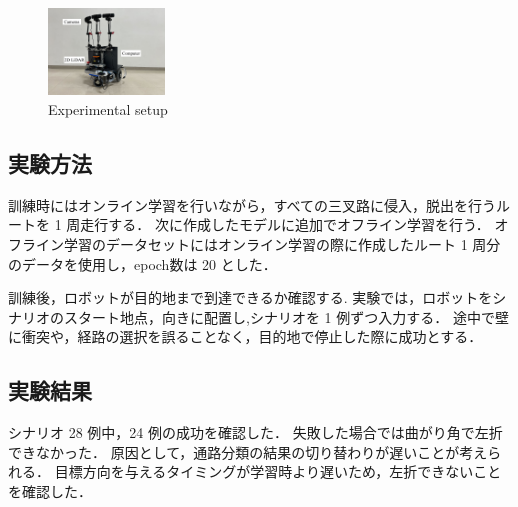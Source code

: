 \documentclass[10pt]{jarticle}
\begin{document}
    \begin{figure}[h]
        \centering
        \includegraphics[width=0.275\textwidth]{./fig/ishiguro/gamma.pdf}
        \caption{Experimental setup}
        \label{fig:gamma}
    \end{figure}
    
    \subsection{実験方法}

    訓練時にはオンライン学習を行いながら，すべての三叉路に侵入，脱出を行うルートを 1 周走行する．
    次に作成したモデルに追加でオフライン学習を行う．
    オフライン学習のデータセットにはオンライン学習の際に作成したルート 1 周分のデータを使用し，epoch数は 20 とした．
   

    訓練後，ロボットが目的地まで到達できるか確認する.
    実験では，ロボットをシナリオのスタート地点，向きに配置し,シナリオを 1 例ずつ入力する．
    途中で壁に衝突や，経路の選択を誤ることなく，目的地で停止した際に成功とする．

    \subsection{実験結果}
    シナリオ 28 例中，24 例の成功を確認した．
    失敗した場合では曲がり角で左折できなかった．
    原因として，通路分類の結果の切り替わりが遅いことが考えられる．
    目標方向を与えるタイミングが学習時より遅いため，左折できないことを確認した．
\end{document}
